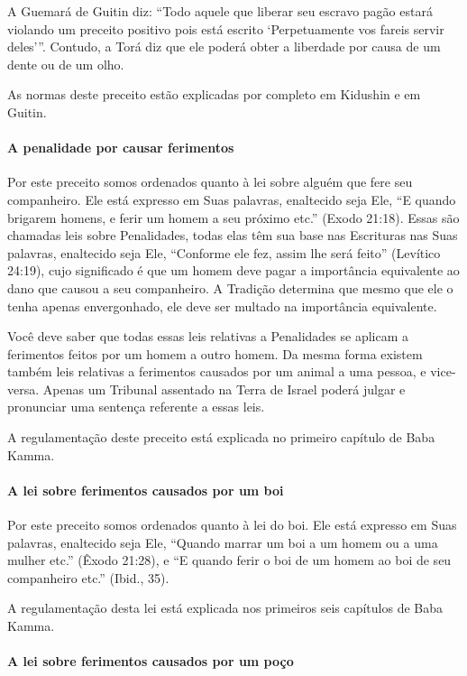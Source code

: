 A Guemará de Guitin diz: ``Todo aquele que liberar seu escravo pagão
estará violando um preceito positivo pois está escrito `Perpetuamente
vos fareis servir deles'''. Contudo, a Torá diz que ele poderá obter a
liberdade por causa de um dente ou de um olho.

As normas deste preceito estão explicadas por completo em Kidushin e em
Guitin.

\paragraph{A penalidade por causar ferimentos}

Por este preceito somos ordenados quanto à lei sobre alguém que fere seu
companheiro. Ele está expresso em Suas palavras, enaltecido seja Ele,
``E quando brigarem homens, e ferir um homem a seu próximo etc.'' (Exodo
21:18). Essas são chamadas leis sobre Penalidades, todas elas têm sua
base nas Escrituras nas Suas palavras, enaltecido seja Ele, ``Conforme
ele fez, assim lhe será feito'' (Levítico 24:19), cujo significado é que
um homem deve pagar a importância equivalente ao dano que causou a seu
companheiro. A Tradição determina que mesmo que ele o tenha apenas
envergonhado, ele deve ser multado na importância equivalente.

Você deve saber que todas essas leis relativas a Penalidades se aplicam
a ferimentos feitos por um homem a outro homem. Da mesma forma existem também leis relativas a ferimentos causados por um animal a uma
pessoa, e vice-versa. Apenas um Tribunal assentado na Terra de Israel
poderá julgar e pronunciar uma sentença referente a essas leis.

A regulamentação deste preceito está explicada no primeiro capítulo de
Baba Kamma.

\paragraph{A lei sobre ferimentos causados por um boi}

Por este preceito somos ordenados quanto à lei do boi. Ele está
expresso em Suas palavras, enaltecido seja Ele, ``Quando marrar um boi
a um homem ou a uma mulher etc.'' (Êxodo 21:28), e ``E quando ferir o
boi de um homem ao boi de seu companheiro etc.'' (Ibid., 35).

A regulamentação desta lei está explicada nos primeiros seis capítulos
de Baba Kamma.

\paragraph{A lei sobre ferimentos causados por um poço}

